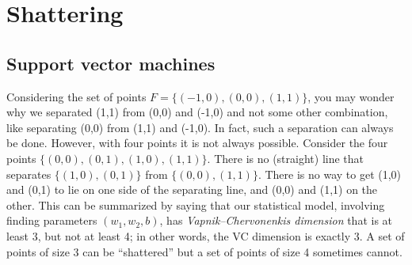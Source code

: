 

\section{Shattering}
\subsection{Support vector machines}
Considering the set of points $F=\{(-1,0),(0,0),(1,1)\}$, you may wonder why we separated (1,1) from (0,0) and (-1,0) and not some other combination, like separating (0,0) from (1,1) and (-1,0).
In fact, such a separation can always be done. However, with four points it is not always possible. Consider the four points $\{(0,0),(0,1),(1,0),(1,1)\}$. There is no (straight) line that separates $\{(1,0),(0,1)\}$ from $\{(0,0),(1,1)\}$. There is no way to get (1,0) and (0,1) to lie on one side of the separating line, and (0,0) and (1,1) on the other. This can be summarized by saying that our statistical model, involving finding parameters $(w_1,w_2,b)$, has \emph{Vapnik--Chervonenkis dimension} that is at least 3, but not at least 4; in other words, the VC dimension is exactly 3. A set of points of size 3 can be ``shattered'' but a set of points of size 4 sometimes cannot.

